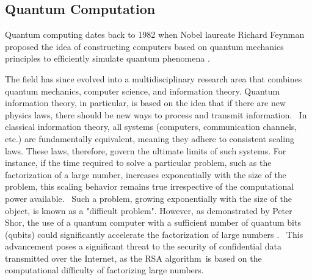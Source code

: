 \subsection*{Quantum Computation}




Quantum computing dates back to 1982 when Nobel laureate Richard Feynman proposed the idea of constructing computers based on quantum mechanics principles to efficiently simulate quantum phenomena \cite{feynman2018simulating}. 

The field has since evolved into a multidisciplinary research area that combines quantum mechanics, computer science, and information theory. Quantum information theory, in particular, is based on the idea that if there are new physics laws, there should be new ways to process and transmit information.  In classical information theory, all systems (computers, communication channels, etc.) are fundamentally equivalent, meaning they adhere to consistent scaling laws. These laws, therefore, govern the ultimate limits of such systems. For instance, if the time required to solve a particular problem, such as the factorization of a large number, increases exponentially with the size of the problem, this scaling behavior remains true irrespective of the computational power available.  Such a problem, growing exponentially with the size of the object, is known as a "difficult problem". However, as demonstrated by Peter Shor, the use of a quantum computer with a sufficient number of quantum bits (qubits) could significantly accelerate the factorization of large numbers \cite{shor1994algorithms}.  This advancement poses a significant threat to the security of confidential data transmitted over the Internet, as the RSA algorithm is based on the computational difficulty of factorizing large numbers.

